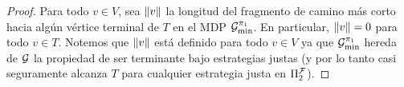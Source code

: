 \begin{proof}

  
  Para todo $v\in V$, sea ${\lVert{v}\rVert}$ la longitud del fragmento de camino más corto hacia algún vértice terminal de $T$ en el MDP
  $\mathcal{G}^{\pi_{1}}_{\min}$.   En particular, ${\lVert{v}\rVert}=0$ para todo $v\in T$.  Notemos que ${\lVert{v}\rVert}$ está definido para todo
  $v\in V$ ya que $\mathcal{G}^{\pi_{1}}_{\min}$ hereda de $\mathcal{G}$ la
  propiedad de ser terminante bajo estrategias justas (y por lo tanto casi seguramente alcanza
  $T$ para cualquier estrategia justa en $\Pi^{\mathcal{F}}_{2}$).
  

\end{proof}
